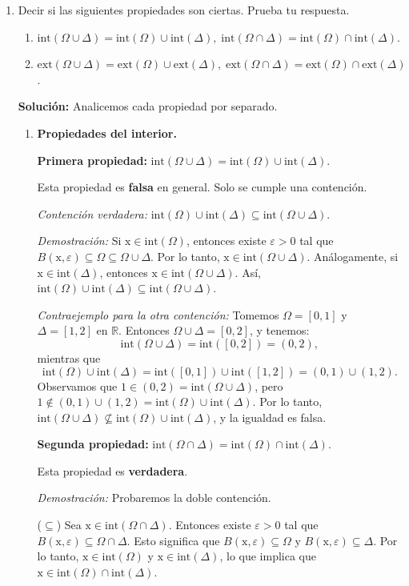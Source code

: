 \documentclass[12pt]{article}
\newcommand{\Ext}{\mathrm{ext}}
\newcommand{\Int}{\mathrm{int}}
\newcommand{\R}{\mathbb R}
\newcommand{\x}{\mathrm x}
\begin{document}
\begin{enumerate}
\item Decir si las siguientes propiedades son ciertas. Prueba tu respuesta.
\begin{enumerate}[(1)]
\item $\Int(\Omega\cup \Delta) = \Int(\Omega)\cup \Int(\Delta),\; \Int(\Omega\cap \Delta) = \Int(\Omega)\cap \Int(\Delta)$.
\item $\Ext(\Omega\cup \Delta) = \Ext(\Omega)\cup \Ext(\Delta),\; \Ext(\Omega\cap \Delta) = \Ext(\Omega)\cap \Ext(\Delta)$.
\end{enumerate}

\textbf{Solución: } Analicemos cada propiedad por separado.

\begin{enumerate}[(1)]
\item \textbf{Propiedades del interior.}

\textbf{Primera propiedad:} $\Int(\Omega\cup \Delta) = \Int(\Omega)\cup \Int(\Delta)$.

Esta propiedad es \textbf{falsa} en general. Solo se cumple una contención.

\textit{Contención verdadera:} $\Int(\Omega)\cup \Int(\Delta) \subseteq \Int(\Omega\cup \Delta)$.

\textit{Demostración:} Si $\x \in \Int(\Omega)$, entonces existe $\varepsilon > 0$ tal que $B(\x, \varepsilon) \subseteq \Omega \subseteq \Omega \cup \Delta$. Por lo tanto, $\x \in \Int(\Omega \cup \Delta)$. Análogamente, si $\x \in \Int(\Delta)$, entonces $\x \in \Int(\Omega \cup \Delta)$. Así, $\Int(\Omega)\cup \Int(\Delta) \subseteq \Int(\Omega\cup \Delta)$.

\textit{Contraejemplo para la otra contención:} Tomemos $\Omega = [0,1]$ y $\Delta = [1,2]$ en $\R$. Entonces $\Omega \cup \Delta = [0,2]$, y tenemos:
\[
\Int(\Omega \cup \Delta) = \Int([0,2]) = (0,2),
\]
mientras que
\[
\Int(\Omega) \cup \Int(\Delta) = \Int([0,1]) \cup \Int([1,2]) = (0,1) \cup (1,2).
\]
Observamos que $1 \in (0,2) = \Int(\Omega \cup \Delta)$, pero $1 \notin (0,1) \cup (1,2) = \Int(\Omega) \cup \Int(\Delta)$. Por lo tanto, $\Int(\Omega \cup \Delta) \not\subseteq \Int(\Omega) \cup \Int(\Delta)$, y la igualdad es falsa.

\textbf{Segunda propiedad:} $\Int(\Omega\cap \Delta) = \Int(\Omega)\cap \Int(\Delta)$.

Esta propiedad es \textbf{verdadera}.

\textit{Demostración:} Probaremos la doble contención.

($\subseteq$) Sea $\x \in \Int(\Omega \cap \Delta)$. Entonces existe $\varepsilon > 0$ tal que $B(\x, \varepsilon) \subseteq \Omega \cap \Delta$. Esto significa que $B(\x, \varepsilon) \subseteq \Omega$ y $B(\x, \varepsilon) \subseteq \Delta$. Por lo tanto, $\x \in \Int(\Omega)$ y $\x \in \Int(\Delta)$, lo que implica que $\x \in \Int(\Omega) \cap \Int(\Delta)$.


\end{enumerate}
\end{enumerate}
\end{document}
